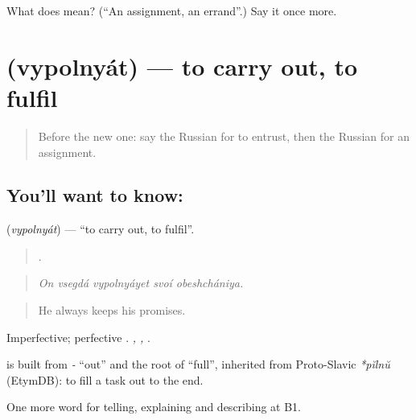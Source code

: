 \begin{tcolorbox}[breakable,colback=teal!4,colframe=teal!35!black,title={Before you move on}]
What does  mean? (\textquotedblleft{}An assignment, an errand\textquotedblright{}.) Say it once more.
\end{tcolorbox}
\section[\texorpdfstring{\ru{выполнять} (vypolnyát)}{выполнять (vypolnyát)}]{ (vypolnyát) — to carry out, to fulfil}

\label{lesson:RU-C359-vypolnyat}



\begin{quote}
Before the new one: say the Russian for to entrust, then the Russian for an assignment.
\end{quote}

\subsection*{You'll want to know: }
\textbf{} (\emph{vypolnyát}) — \textquotedblleft{}to carry out, to fulfil\textquotedblright{}.

\begin{quote}
    .
\end{quote}

\begin{quote}
\emph{On vsegdá vypolnyáyet svoí obeshchániya.}
\end{quote}

\begin{quote}
He always keeps his promises.
\end{quote}

Imperfective; perfective \emph{}. \emph{ , , }.

\begin{cousinweb}
\textbf{} is built from \emph{-} \textquotedblleft{}out\textquotedblright{} and the root of \emph{} \textquotedblleft{}full\textquotedblright{}, inherited from Proto-Slavic \emph{*pĭlnŭ} (EtymDB): to fill a task out to the end.
\end{cousinweb}

\begin{grammarlens}[title={What you've built}]
One more word for telling, explaining and describing at B1.
\end{grammarlens}

